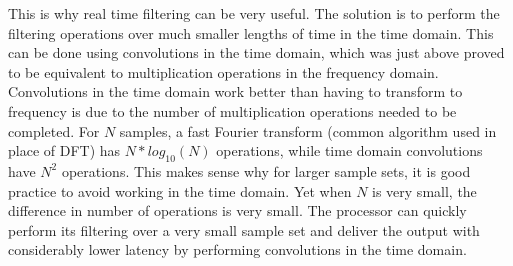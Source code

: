 \documentclass[12pt]{article}
\begin{document}
This is why real time filtering can be very useful. The solution is to perform the filtering operations over much smaller lengths of time in the time domain. This can be done using convolutions in the time domain, which was just above proved to be equivalent to multiplication operations in the frequency domain. Convolutions in the time domain work better than having to transform to frequency is due to the number of multiplication operations needed to be completed. For $N$ samples, a fast Fourier transform (common algorithm used in place of DFT) has $N*log_{10}(N)$ operations, while time domain convolutions have $N^2$ operations. This makes sense why for larger sample sets, it is good practice to avoid working in the time domain. Yet when $N$ is very small, the difference in number of operations is very small. The processor can quickly perform its filtering over a very small sample set and deliver the output with considerably lower latency by performing convolutions in the time domain.
\\
\\ 	
\end{document}
